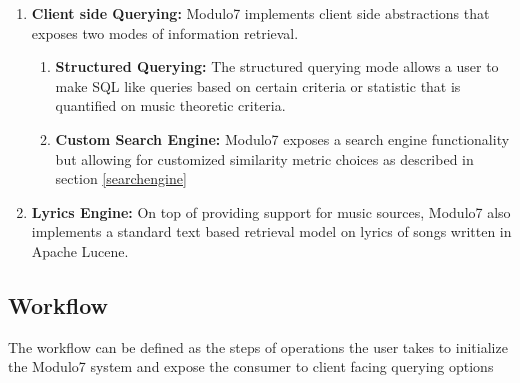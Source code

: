 \documentclass{article}
\begin{document}
\begin{enumerate}
\item \textbf{Client side Querying: } Modulo7 implements client side abstractions that exposes two modes of information retrieval. 
\begin{enumerate}
\item \textbf{Structured Querying: } The structured querying mode allows a user to make SQL like queries based on certain criteria or statistic that is quantified on music theoretic criteria. 
\item \textbf{Custom Search Engine: } Modulo7 exposes a search engine functionality but allowing for customized similarity metric choices as described in section \ref{searchengine} 
\end{enumerate}

\item \textbf{Lyrics Engine: } On top of providing support for music sources, Modulo7 also implements a standard text based retrieval model on lyrics of songs written in Apache Lucene.  

\end{enumerate}

\subsection{Workflow} 

The workflow can be defined as the steps of operations the user takes to initialize the Modulo7 system and expose the consumer to client facing querying options
\end{document}
